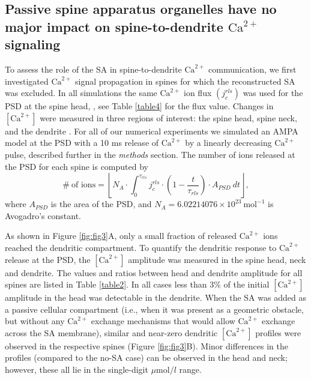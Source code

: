 \documentclass[12pt]{article}
\begin{document}
\subsection*{Passive spine apparatus organelles have no major impact on spine-to-dendrite $\textrm{Ca}^{2+}$ signaling}
To assess the role of the SA in spine-to-dendrite $\textrm{Ca}^{2+}$ communication, we first investigated $\textrm{Ca}^{2+}$ signal propagation in spines for which the reconstructed SA was excluded. In all simulations the same $\textrm{Ca}^{2+}$ ion flux $(j_c^{rls})$ was used for the PSD at the spine head, \cite{Keller2008,Higley2012}, see Table \ref{table4} for the flux value. Changes in $[\textrm{Ca}^{2+}]$ were measured in three regions of interest: the spine head, spine neck, and the dendrite \cite{Breit2018}. For all of our numerical experiments we simulated an AMPA model at the PSD with a 10 ms release of $\textrm{Ca}^{2+}$ by a linearly decreasing $\textrm{Ca}^{2+}$ pulse, described further in the \textit{methods} section. The number of ions released at the PSD for each spine %
is computed by
\[
\#\ \textrm{of ions} = \left\lfloor N_A\cdot \int_0^{\tau_{rls}}j_c^{rls}\cdot\left(1-\frac{t}{\tau_{rls}}\right)\cdot A_{PSD}\ dt\right\rfloor,
\]
where $A_{PSD}$ is the area of the PSD, and $N_A= 6.02214076\times 10^{23}\  \textrm{mol}^{-1}$ is Avogadro's constant.

As shown in Figure \ref{fig:fig3}A, only a small fraction of released $\textrm{Ca}^{2+}$ ions reached the dendritic compartment. To quantify the dendritic response to $\textrm{Ca}^{2+}$ release at the PSD, the $[\textrm{Ca}^{2+}]$ amplitude was measured in the spine head, neck and dendrite. The values and ratios between head and dendrite amplitude for all spines are listed in Table \ref{table2}. In all cases less than 3\%  of the initial $[\textrm{Ca}^{2+}]$ amplitude in the head was detectable in the dendrite. When the SA was added as a passive cellular compartment (i.e., when it was present as a geometric obstacle, but without any $\textrm{Ca}^{2+}$ exchange mechanisms that would allow $\textrm{Ca}^{2+}$ exchange across the SA membrane), similar and near-zero dendritic $[\textrm{Ca}^{2+}]$ profiles were observed in the respective spines (Figure \ref{fig:fig3}B). Minor differences in the profiles (compared to the no-SA case) can be observed in the head and neck; however, these all lie in the single-digit $\mu\textrm{mol}/l$ range. 
\end{document}
